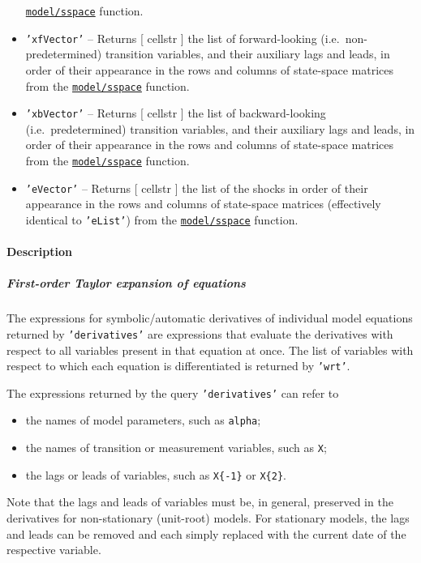 \begin{itemize}
  \href{model/sspace}{\texttt{model/sspace}} function.
\item
  \texttt{'xfVector'} -- Returns {[} cellstr {]} the list of
  forward-looking (i.e.~non-predetermined) transition variables, and
  their auxiliary lags and leads, in order of their appearance in the
  rows and columns of state-space matrices from the
  \href{model/sspace}{\texttt{model/sspace}} function.
\item
  \texttt{'xbVector'} -- Returns {[} cellstr {]} the list of
  backward-looking (i.e.~predetermined) transition variables, and their
  auxiliary lags and leads, in order of their appearance in the rows and
  columns of state-space matrices from the
  \href{model/sspace}{\texttt{model/sspace}} function.
\item
  \texttt{'eVector'} -- Returns {[} cellstr {]} the list of the shocks
  in order of their appearance in the rows and columns of state-space
  matrices (effectively identical to \texttt{'eList'}) from the
  \href{model/sspace}{\texttt{model/sspace}} function.
\end{itemize}

\paragraph{Description}\label{description}

\subparagraph{First-order Taylor expansion of
equations}\label{first-order-taylor-expansion-of-equations-1}

The expressions for symbolic/automatic derivatives of individual model
equations returned by \texttt{'derivatives'} are expressions that
evaluate the derivatives with respect to all variables present in that
equation at once. The list of variables with respect to which each
equation is differentiated is returned by \texttt{'wrt'}.

The expressions returned by the query \texttt{'derivatives'} can refer
to

\begin{itemize}
\itemsep1pt\parskip0pt
\item
  the names of model parameters, such as \texttt{alpha};
\item
  the names of transition or measurement variables, such as \texttt{X};
\item
  the lags or leads of variables, such as \texttt{X\{-1\}} or
  \texttt{X\{2\}}.
\end{itemize}

Note that the lags and leads of variables must be, in general, preserved
in the derivatives for non-stationary (unit-root) models. For stationary
models, the lags and leads can be removed and each simply replaced with
the current date of the respective variable.

